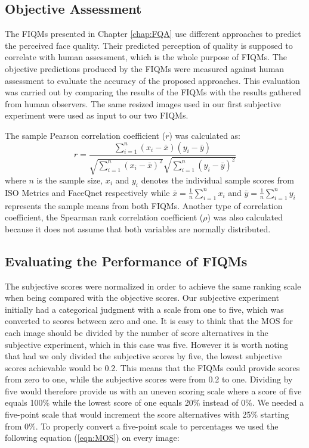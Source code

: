 \subsection{Objective Assessment}
The FIQMs presented in Chapter \ref{chap:FQA} use different approaches to predict the perceived face quality. Their predicted perception of quality is supposed to correlate with human assessment, which is the whole purpose of FIQMs. The objective predictions produced by the FIQMs were measured against human assessment to evaluate the accuracy of the proposed approaches. This evaluation was carried out by comparing the results of the FIQMs with the results gathered from human observers. The same resized images used in our first subjective experiment were used as input to our two FIQMs. 


The sample Pearson correlation coefficient ($r$) was calculated as: 
\begin{equation}
    {\displaystyle r={\frac {\sum _{i=1}^{n}(x_{i}-{\bar {x}})(y_{i}-{\bar {y}})}{{\sqrt {\sum _{i=1}^{n}(x_{i}-{\bar {x}})^{2}}}{\sqrt {\sum _{i=1}^{n}(y_{i}-{\bar {y}})^{2}}}}}}
\end{equation}
where $n$ is the sample size, $x_{i}$ and $y_{i}$ denotes the individual sample scores from ISO Metrics and FaceQnet respectively while ${\bar {x}}={\frac {1}{n}}\sum _{i=1}^{n}x_{i}$ and ${\bar {y}}={\frac {1}{n}}\sum _{i=1}^{n}y_{i}$ represents the sample means from both FIQMs. Another type of correlation coefficient, the Spearman rank correlation coefficient ($\rho$) \cite{wiki:spearman} was also calculated because it does not assume that both variables are normally distributed.

\subsection{Evaluating the Performance of FIQMs}
The subjective scores were normalized in order to achieve the same ranking scale when being compared with the objective scores. Our subjective experiment initially had a categorical judgment with a scale from one to five, which was converted to scores between zero and one. It is easy to think that the MOS for each image should be divided by the number of score alternatives in the subjective experiment, which in this case was five. However it is worth noting that had we only divided the subjective scores by five, the lowest subjective scores achievable would be 0.2. This means that the FIQMs could provide scores from zero to one, while the subjective scores were from 0.2 to one. Dividing by five would therefore provide us with an uneven scoring scale where a score of five equals 100\% while the lowest score of one equals 20\% instead of 0\%. We needed a five-point scale that would increment the score alternatives with 25\% starting from 0\%. To properly convert a five-point scale to percentages we used the following equation (\ref{eqn:MOS}) on every image:

